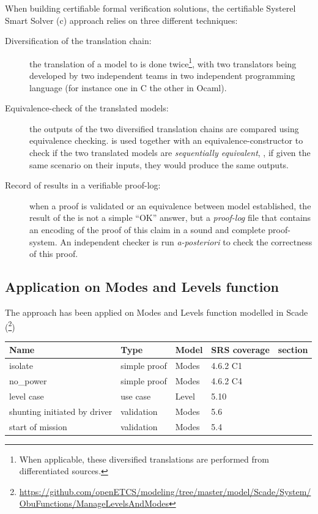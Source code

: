 When building certifiable formal verification
solutions, the certifiable Systerel Smart Solver (c\smartsolver{}) approach relies on three different techniques:
\begin{description}
\item [Diversification of the translation chain:] the translation of a model to \HLL{} is
  done twice\footnote{When applicable, these diversified translations
    are performed from differentiated sources.}, with two
  translators being developed by two independent teams in two  independent programming language (for instance one in C the other in Ocaml). 
\item [Equivalence-check of the translated models:] the  outputs of the two diversified
  translation chains are compared using equivalence
  checking. \smartsolver{} is used together with an equivalence-constructor to check if
  the two translated models are {\em sequentially equivalent}, \ie, if
  given the same scenario on their inputs, they would produce the same
  outputs.
\item [Record of results in a verifiable proof-log:] when a proof is validated or an equivalence between model established, the result of the \smartsolver{} is not a simple  ``OK'' answer, but a {\em proof-log} file that
  contains an encoding of the proof of this claim in a sound and
  complete proof-system. An independent checker is run
  \textit{a-posteriori} to check the correctness of this proof.
\end{description}





\subsection{Application on Modes and Levels function}

The approach has been applied on Modes and Levels function modelled in Scade (\footnote{\url{https://github.com/openETCS/modeling/tree/master/model/Scade/System/ObuFunctions/ManageLevelsAndModes}})

\begin{tabular}{|l|l|l|l|l}
\hline
\textbf{Name} & \textbf{Type} & \textbf{Model} & \textbf{SRS coverage} & \textbf{section} \\ \hline
isolate & simple proof & Modes  & 4.6.2 C1 &\\
no\_power & simple proof & Modes  & 4.6.2 C4 &\\
level case & use case & Level  & 5.10 &\\
shunting initiated by driver & validation & Modes  & 5.6 &\\
start of mission & validation & Modes  & 5.4 &\\
\hline
\end{tabular}


